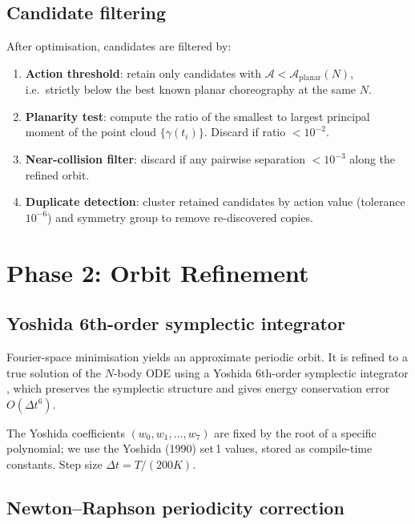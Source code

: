 \documentclass[12pt, a4paper]{article}
\theoremstyle{definition}
\newcommand{\Action}{\mathcal{A}}
\begin{document}
\subsection{Candidate filtering}

After optimisation, candidates are filtered by:
\begin{enumerate}[leftmargin=1.8em]
  \item \textbf{Action threshold}: retain only candidates with
        $\Action < \Action_{\mathrm{planar}}(N)$, i.e.\ strictly below
        the best known planar choreography at the same $N$.
  \item \textbf{Planarity test}: compute the ratio of the smallest to largest
        principal moment of the point cloud $\{\gamma(t_i)\}$.  Discard if
        ratio $< 10^{-2}$.
  \item \textbf{Near-collision filter}: discard if any pairwise separation
        $< 10^{-3}$ along the refined orbit.
  \item \textbf{Duplicate detection}: cluster retained candidates by action
        value (tolerance $10^{-6}$) and symmetry group to remove re-discovered
        copies.
\end{enumerate}

\section{Phase 2: Orbit Refinement}

\subsection{Yoshida 6th-order symplectic integrator}

Fourier-space minimisation yields an approximate periodic orbit.  It is
refined to a true solution of the $N$-body ODE using a Yoshida 6th-order
symplectic integrator \cite{Yoshida1990}, which preserves the symplectic
structure and gives energy conservation error $O(\Delta t^6)$.

The Yoshida coefficients $(w_0, w_1, \ldots, w_7)$ are fixed by the
root of a specific polynomial; we use the Yoshida (1990) set\,1 values,
stored as compile-time constants.  Step size $\Delta t = T/(200K)$.

\subsection{Newton--Raphson periodicity correction}
\end{document}
